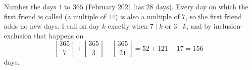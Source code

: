 Number the days $1$ to $365$ (February 2021 has $28$ days). Every day on which the first friend is called (a multiple of $14$) is also a multiple of $7$, so the first friend adds no new days. I call on day $k$ exactly when $7\mid k$ or $3\mid k$, and by inclusion-exclusion that happens on
\[\left\lfloor\dfrac{365}{7}\right\rfloor+\left\lfloor\dfrac{365}{3}\right\rfloor-\left\lfloor\dfrac{365}{21}\right\rfloor=52+121-17=\boxed{156}\]
days.
